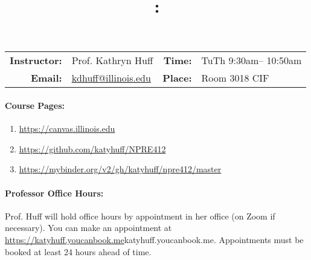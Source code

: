 \documentclass[11pt, a4paper]{article}
\title{\CourseNumber: \CourseTitle\\}
\author{\CourseUniversity}
\date{\CourseSemester \CourseYear}
\makeatletter
\newcommand{\CourseNumber}{NPRE412}
\newcommand{\CourseInstructor}{Prof. Kathryn Huff\xspace}%
\newcommand{\CourseDays}{TuTh\xspace}%
\newcommand{\CourseStart}{9:30am\xspace}%
\newcommand{\CourseEnd}{10:50am\xspace}%
\newcommand{\CourseInstructorEmail}{kdhuff@illinois.edu}
\newcommand{\HuffOfficeHourPlace}{111B Talbot\xspace}
\newcommand{\CourseRoom}{Room 3018\xspace}%
\newcommand{\CourseBuilding}{CIF\xspace}%
\makeatother
\begin{document}
\maketitle
\renewcommand{\arraystretch}{1.5}
\begin{center}
\begin{table}[h]
\begin{tabularx}{\textwidth}{rXrX}
\hline
\textbf{Instructor:} & \CourseInstructor & \textbf{Time:} & \CourseDays \CourseStart -- \CourseEnd \\
\textbf{Email:} &  \href{mailto:\CourseInstructorEmail}{\CourseInstructorEmail} & \textbf{Place:} & \CourseRoom \CourseBuilding\\
\hline
\end{tabularx}
\end{table}
\end{center}

\paragraph{Course Pages:}
\begin{enumerate}
        \item \url{https://canvas.illinois.edu}
        \item \url{https://github.com/katyhuff/\CourseNumber}
        \item \url{https://mybinder.org/v2/gh/katyhuff/npre412/master}
\end{enumerate}


\paragraph{Professor Office Hours:} Prof. Huff will hold office hours by 
appointment in her office (on Zoom if necessary). You can make an appointment at 
\url{https://katyhuff.youcanbook.me}{katyhuff.youcanbook.me}. Appointments must be booked at least 24 hours 
ahead of time.
\end{document}
